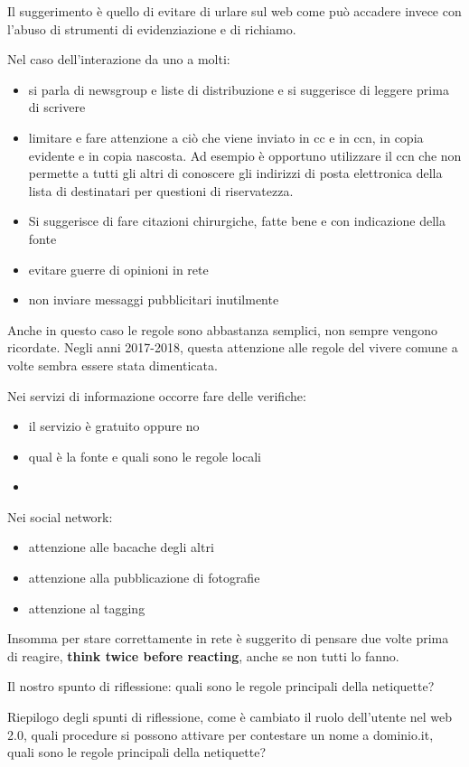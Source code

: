 Il suggerimento è quello di evitare di urlare sul web come può accadere invece con l'abuso di strumenti di evidenziazione e di richiamo.\par 
Nel caso dell'interazione da uno a molti:
\begin{itemize}
    \item si parla di newsgroup e liste di distribuzione e si suggerisce di leggere prima di scrivere 
    \item limitare e fare attenzione a ciò che viene inviato in cc e in ccn, in copia evidente e in copia nascosta. Ad esempio è opportuno utilizzare il ccn che non permette a tutti gli altri di conoscere gli indirizzi di posta elettronica della lista di destinatari per questioni di riservatezza. 
    \item Si suggerisce di fare citazioni chirurgiche, fatte bene e con indicazione della fonte 
    \item evitare guerre di opinioni in rete 
    \item non inviare messaggi pubblicitari inutilmente
\end{itemize}

Anche in questo caso le regole sono abbastanza semplici, non sempre vengono ricordate. Negli anni 2017-2018, questa attenzione alle regole del vivere comune a volte sembra essere stata dimenticata. \par

Nei servizi di informazione occorre fare delle verifiche:

\begin{itemize}
    \item il servizio è gratuito oppure no
    \item qual è la fonte e quali sono le regole locali
    \item 
\end{itemize}
\par
Nei social network:

\begin{itemize}
    \item attenzione alle bacache degli altri
    \item attenzione alla pubblicazione di fotografie
    \item attenzione al tagging 
\end{itemize}

Insomma per stare correttamente in rete è suggerito di pensare due volte prima di reagire, \textbf{think twice before reacting}, anche se non tutti lo fanno. \par
Il nostro spunto di riflessione: quali sono le regole principali della netiquette?\par
Riepilogo degli spunti di riflessione, come è cambiato il ruolo dell'utente nel web 2.0, quali procedure si possono attivare per contestare un nome a dominio.it, quali sono le regole principali della netiquette?
